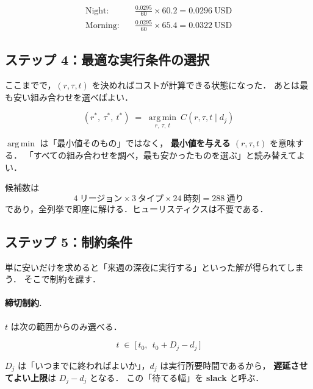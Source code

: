 \documentclass[11pt,a4paper]{ltjsarticle}
\begin{document}
\begin{align}
\text{Night}:\quad   &\frac{0.0295}{60}\times 60.2 = 0.0296\ \text{USD} \\
\text{Morning}:\quad &\frac{0.0295}{60}\times 65.4 = 0.0322\ \text{USD}
\end{align}

\subsection{ステップ 4：最適な実行条件の選択}

ここまでで，$(r,\tau,t)$ を決めればコストが計算できる状態になった．
あとは最も安い組み合わせを選べばよい．

\begin{equation}
(r^{*},\ \tau^{*},\ t^{*})
\;=\;
\operatorname*{arg\,min}_{r,\ \tau,\ t}\ C(r,\tau,t \mid d_j)
\label{eq:argmin}
\end{equation}

$\operatorname*{arg\,min}$ は「最小値そのもの」ではなく，
\textbf{最小値を与える $(r,\tau,t)$} を意味する．
「すべての組み合わせを調べ，最も安かったものを選ぶ」と読み替えてよい．

候補数は
\[
4\ \text{リージョン} \times 3\ \text{タイプ} \times 24\ \text{時刻}
= 288\ \text{通り}
\]
であり，全列挙で即座に解ける．ヒューリスティクスは不要である．

\subsection{ステップ 5：制約条件}

単に安いだけを求めると「来週の深夜に実行する」といった解が得られてしまう．
そこで制約を課す．

\paragraph{締切制約.}
$t$ は次の範囲からのみ選べる．

\begin{equation}
t \;\in\; \bigl[\,t_0,\ \ t_0 + D_j - d_j\,\bigr]
\label{eq:slack}
\end{equation}

$D_j$ は「いつまでに終わればよいか」，$d_j$ は実行所要時間であるから，
\textbf{遅延させてよい上限}は $D_j - d_j$ となる．
この「待てる幅」を \textbf{slack} と呼ぶ．
\end{document}
